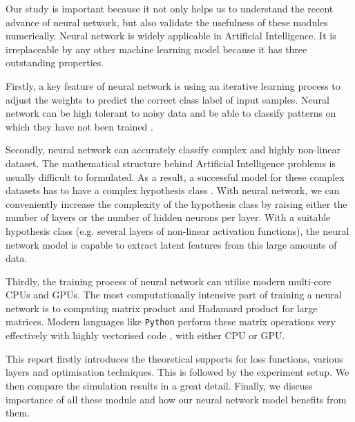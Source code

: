 Our study is important because it not only helps us to understand the recent advance of neural network,  but also validate the usefulness of these modules numerically. Neural network is widely applicable in Artificial Intelligence. It is irreplaceable by any other machine learning model because it has three outstanding properties.   

Firstly, a key feature of neural network is using an iterative learning process to adjust the weights to predict the correct class label of input samples.
Neural network can be high tolerant to noisy data and be able to classify patterns on which they have not been trained \citep{58871}.

Secondly, neural network can accurately classify complex and highly non-linear dataset. The mathematical structure behind Artificial Intelligence problems is usually difficult to formulated. As a result, a successful model for these complex datasets has to have a complex hypothesis class \citep{Bishop:2006:PRM:1162264}. 
With neural network, we can conveniently increase the complexity of the hypothesis class by raising either the number of layers or the number of hidden neurons per layer. 
With a suitable hypothesis class (e.g. several layers of non-linear activation functions), the neural network model is capable to extract latent features from this large amounts of data.

Thirdly, the training process of neural network can utilise modern multi-core CPUs and GPUs. The most computationally intensive part of training a neural network is to computing matrix product and Hadamard product for large matrices. Modern languages like \texttt{Python} perform these matrix operations very effectively with highly vectorised code \citet{5452452}, with either CPU or GPU.

This report firstly introduces the theoretical supports for loss functions, various layers and optimisation techniques. 
This is followed by the experiment setup. We then compare the simulation results in a great detail.
Finally, we discuss importance of all these module and how our neural network model benefits from them.
